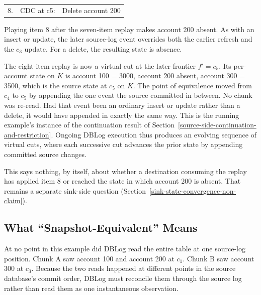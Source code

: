\documentclass[letterpaper,10pt,twocolumn]{article}
\begin{document}
\begin{center}\ttfamily\footnotesize
\begin{tabular}{@{}r@{\hskip 0.4em}l@{\hskip 1em}l@{}}
8. & CDC at c5: & Delete account 200\\
\end{tabular}
\end{center}

Playing item 8 after the seven-item replay makes account 200 absent. As
with an insert or update, the later source-log event overrides both the
earlier refresh and the $c_3$ update. For a delete, the resulting state
is absence.

The eight-item replay is now a virtual cut at the later frontier
$f' = c_5$. Its per-account state on $K$ is account 100 = 3000, account
200 absent, account 300 = 3500, which is the source state at $c_5$ on
$K$. The point of equivalence moved from $c_4$ to $c_5$ by appending the
one event the source committed in between. No chunk was re-read. Had
that event been an ordinary insert or update rather than a delete, it
would have appended in exactly the same way. This is
the running example's instance of the continuation result of
Section~\ref{source-side-continuation-and-restriction}. Ongoing DBLog
execution thus produces an evolving sequence of virtual cuts, where each
successive cut advances the prior state by appending committed source
changes.

This says nothing, by itself, about whether a destination consuming the
replay has applied item 8 or reached the state in which account 200 is
absent. That remains a separate sink-side question
(Section~\ref{sink-state-convergence-non-claim}).

\begin{figure}[t]
  
\end{figure}

\subsection{What ``Snapshot-Equivalent'' Means}\label{what-snapshot-equivalent-means-here}

At no point in this example did DBLog read the entire table at one
source-log position. Chunk A saw account 100 and account 200 at
$c_1$. Chunk B saw account 300 at $c_3$. Because the two reads
happened at different points in the source database's commit order,
DBLog must reconcile them through the source log rather than read them
as one instantaneous observation.
\end{document}
